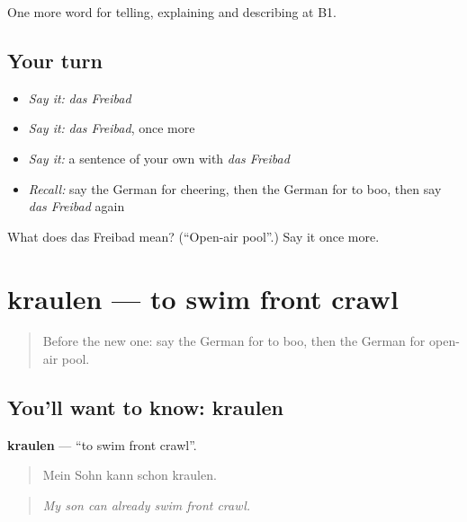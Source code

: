 \begin{grammarlens}[title={What you've built}]
One more word for telling, explaining and describing at B1.
\end{grammarlens}

\subsection*{Your turn}
\begin{itemize}
\raggedright
  \item \emph{Say it:} \emph{das Freibad}
  \item \emph{Say it:} \emph{das Freibad}, once more
  \item \emph{Say it:} a sentence of your own with \emph{das Freibad}
  \item \emph{Recall:} say the German for cheering, then the German for to boo, then say \emph{das Freibad} again
\end{itemize}

\begin{tcolorbox}[breakable,colback=teal!4,colframe=teal!35!black,title={Before you move on}]
What does das Freibad mean? (\textquotedblleft{}Open-air pool\textquotedblright{}.) Say it once more.
\end{tcolorbox}
\section[kraulen]{kraulen — to swim front crawl}

\label{lesson:GE-C511-kraulen}



\begin{quote}
Before the new one: say the German for to boo, then the German for open-air pool.
\end{quote}

\subsection*{You'll want to know: kraulen}
\textbf{kraulen} — \textquotedblleft{}to swim front crawl\textquotedblright{}.

\begin{quote}
Mein Sohn kann schon kraulen.
\end{quote}

\begin{quote}
\emph{My son can already swim front crawl.}
\end{quote}

